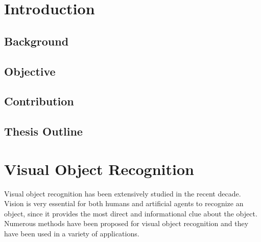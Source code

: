 \documentclass[12pt,final,twoside]{report}
\theoremstyle{plain}
\theoremstyle{definition}
\theoremstyle{remark}
\begin{document}

\chapter{Introduction}
\section{Background}
\section{Objective}
\section{Contribution}
\section{Thesis Outline}


\cleardoublepage
\chapter{Visual Object Recognition}
Visual object recognition has been extensively studied in the recent decade. Vision is very essential for both humans and artificial agents to recognize an object, since it provides the most direct and informational clue about the object. Numerous methods have been proposed for visual object recognition and they have been used in a variety of applications.
\end{document}
